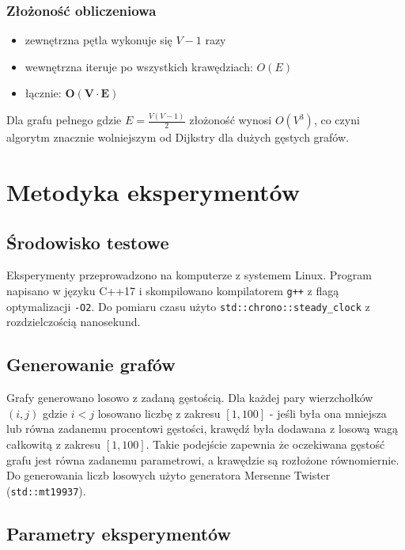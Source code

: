 \documentclass[12pt,a4paper]{article}
\begin{document}
\subsubsection*{Złożoność obliczeniowa}
 
\begin{itemize}
    \item zewnętrzna pętla wykonuje się $V - 1$ razy
    \item wewnętrzna iteruje po wszystkich krawędziach: $O(E)$
    \item łącznie: $\mathbf{O(V \cdot E)}$
\end{itemize}
 
Dla grafu pełnego gdzie $E = \frac{V(V-1)}{2}$ złożoność wynosi $O(V^3)$,
co czyni algorytm znacznie wolniejszym od Dijkstry dla dużych gęstych grafów.
 
\section{Metodyka eksperymentów}
 
\subsection{Środowisko testowe}
 
Eksperymenty przeprowadzono na komputerze z systemem Linux. Program
napisano w języku C++17 i skompilowano kompilatorem \texttt{g++}
z flagą optymalizacji \texttt{-O2}. Do pomiaru czasu użyto
\texttt{std::chrono::steady\_clock} z rozdzielczością nanosekund.
 
\subsection{Generowanie grafów}
 
Grafy generowano losowo z zadaną gęstością. Dla każdej pary wierzchołków
$(i, j)$ gdzie $i < j$ losowano liczbę z zakresu $[1, 100]$ - jeśli
była ona mniejsza lub równa zadanemu procentowi gęstości, krawędź była
dodawana z losową wagą całkowitą z zakresu $[1, 100]$. Takie podejście
zapewnia że oczekiwana gęstość grafu jest równa zadanemu parametrowi,
a krawędzie są rozłożone równomiernie. Do generowania liczb losowych
użyto generatora Mersenne Twister (\texttt{std::mt19937}).
 
\subsection{Parametry eksperymentów}
 
\end{document}
